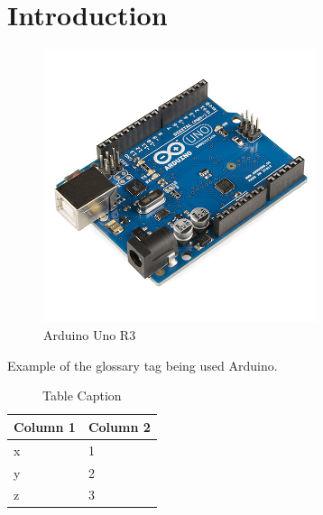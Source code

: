 \newpage
\chapter*{Introduction}

%
\begin{figure}[ht]
	\centering
	\includegraphics[width=8cm]{images/01}
	\caption{Arduino Uno R3 \citep{wikipedia-13}}
	\label{fig:arduino_uno_r3}
\end{figure}
%

Example of the glossary tag being used \gls{Arduino}.

%
\begin{table}
	\centering
	\begin{tabular}{p{4cm} l}
		\toprule
		Column 1 & Column 2\\ \midrule
		x & 1 \\
		y & 2 \\
		z & 3 \\
		\bottomrule
	\end{tabular}
	\caption{Table Caption}
	\label{tab:table_label}
\end{table}
%
